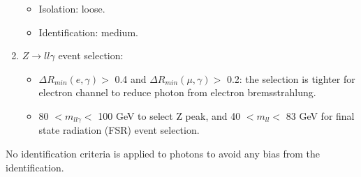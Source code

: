 \begin{enumerate}
\begin{itemize}
        \item Isolation: loose.
        \item Identification: medium.
    \end{itemize}
    \item $Z \rightarrow ll\gamma$ event selection:
    \begin{itemize}
        \item $\Delta R_{min}(e,\gamma) > $ 0.4 and $\Delta R_{min}(\mu,\gamma) > $ 0.2: the selection is tighter for electron channel to reduce photon from electron bremsstrahlung.
        \item 80 $ < m_{ll\gamma} < $ 100 GeV to select Z peak,  and 40 $ < m_{ll} < $ 83 GeV for final state radiation (FSR) event selection. 
    \end{itemize}
\end{enumerate}
No identification criteria is applied to photons to avoid any bias from the identification.

